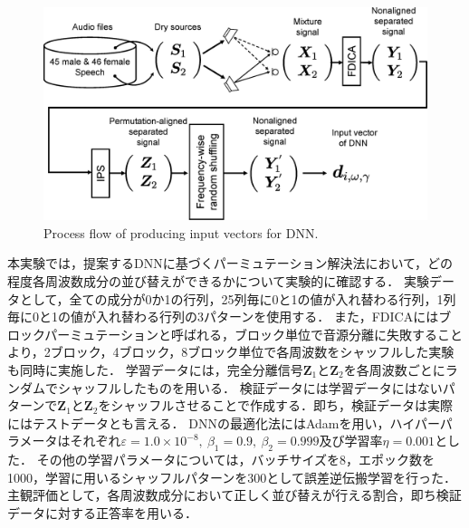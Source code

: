 \begin{figure}[t]
    \begin{center}
        \includegraphics[width=0.999\columnwidth]{figures/make_inputvec.eps}
    \end{center}
    \vspace{-8pt}
	\caption{Process flow of producing input vectors for DNN.}
	\label{fig:make_inputvec}
\end{figure}

本実験では，提案するDNNに基づくパーミュテーション解決法において，どの程度各周波数成分の並び替えができるかについて実験的に確認する．
実験データとして，全ての成分が0か1の行列，25列毎に0と1の値が入れ替わる行列，1列毎に0と1の値が入れ替わる行列の3パターンを使用する．
また，FDICAにはブロックパーミュテーションと呼ばれる，ブロック単位で音源分離に失敗することより，2ブロック，4ブロック，8ブロック単位で各周波数をシャッフルした実験も同時に実施した．
学習データには，完全分離信号$\bm{Z}_1$と$\bm{Z}_2$を各周波数ごとにランダムでシャッフルしたものを用いる．
検証データには学習データにはないパターンで$\bm{Z}_1$と$\bm{Z}_2$をシャッフルさせることで作成する．即ち，検証データは実際にはテストデータとも言える．
DNNの最適化法にはAdamを用い，ハイパーパラメータはそれぞれ$\varepsilon=1.0\times10^{-8},~\beta_1 = 0.9,~\beta_2 = 0.999$及び学習率$\eta=0.001$とした．
その他の学習パラメータについては，バッチサイズを8，エポック数を1000，学習に用いるシャッフルパターンを300として誤差逆伝搬学習を行った．
主観評価として，各周波数成分において正しく並び替えが行える割合，即ち検証データに対する正答率を用いる．


